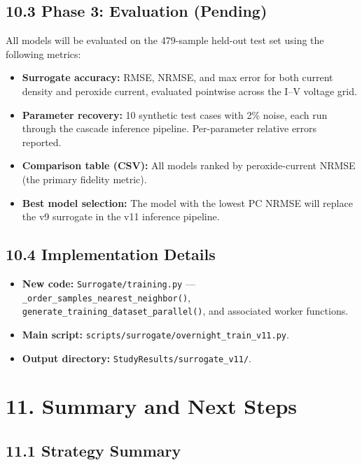 \documentclass[11pt]{article}
\begin{document}
\subsection*{10.3 Phase 3: Evaluation (Pending)}

All models will be evaluated on the 479-sample held-out test set using
the following metrics:
\begin{itemize}
  \item \textbf{Surrogate accuracy:} RMSE, NRMSE, and max error for both
        current density and peroxide current, evaluated pointwise across
        the I--V voltage grid.
  \item \textbf{Parameter recovery:} 10 synthetic test cases with 2\% noise,
        each run through the cascade inference pipeline.  Per-parameter
        relative errors reported.
  \item \textbf{Comparison table (CSV):} All models ranked by
        peroxide-current NRMSE (the primary fidelity metric).
  \item \textbf{Best model selection:} The model with the lowest PC NRMSE
        will replace the v9 surrogate in the v11 inference pipeline.
\end{itemize}

\subsection*{10.4 Implementation Details}

\begin{itemize}
  \item \textbf{New code:} \texttt{Surrogate/training.py} ---
        \texttt{\_order\_samples\_nearest\_neighbor()},
        \texttt{generate\_training\_dataset\_parallel()}, and associated
        worker functions.
  \item \textbf{Main script:} \texttt{scripts/surrogate/overnight\_train\_v11.py}.
  \item \textbf{Output directory:} \texttt{StudyResults/surrogate\_v11/}.
\end{itemize}


\section*{11. Summary and Next Steps}

\subsection*{11.1 Strategy Summary}
\end{document}
